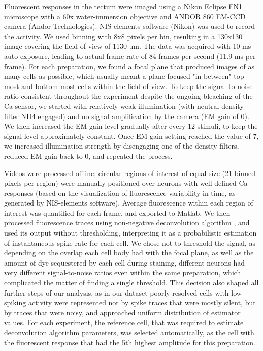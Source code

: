 \documentclass{article}
\begin{document}
Fluorescent responses in the tectum were imaged using a Nikon Eclipse FN1 microscope with a 60x water-immersion objective and ANDOR 860 EM-CCD camera (Andor Technologies). NIS-elements software (Nikon) was used to record the activity. We used binning with 8x8 pixels per bin, resulting in a 130x130 image covering the field of view of 1130 um. The data was acquired with 10 ms auto-exposure, leading to actual frame rate of 84 frames per second (11.9 ms per frame). For each preparation, we found a focal plane that produced images of as many cells as possible, which usually meant a plane focused "in-between" top-most and bottom-most cells within the field of view. To keep the signal-to-noise ratio consistent throughout the experiment despite the ongoing bleaching of the Ca sensor, we started with relatively weak illumination (with neutral density filter ND4 engaged) and no signal amplification by the camera (EM gain of 0). We then increased the EM gain level gradually after every 12 stimuli, to keep the signal level approximately constant. Once EM gain setting reached the value of 7, we increased illumination strength by disengaging one of the density filters, reduced EM gain back to 0, and repeated the process.

Videos were processed offline; circular regions of interest of equal size (21 binned pixels per region) were manually positioned over neurons with well defined Ca responses (based on the visualization of fluorescence variability in time, as generated by NIS-elements software). Average fluorescence within each region of interest was quantified for each frame, and exported to Matlab. We then processed fluorescence traces using non-negative deconvolution algorithm \citep{vogelstein2010oopsi}, and used its output without thresholding, interpreting it as a probabilistic estimation of instantaneous spike rate for each cell. We chose not to threshold the signal, as depending on the overlap each cell body had with the focal plane, as well as the amount of dye sequestered by each cell during staining, different neurons had very different signal-to-noise ratios even within the same preparation, which complicated the matter of finding a single threshold. This decision also shaped all further steps of our analysis, as in our dataset poorly resolved cells with low spiking activity were represented not by spike traces that were mostly silent, but by traces that were noisy, and approached uniform distribution of estimator values. For each experiment, the reference cell, that was required to estimate deconvolution algorithm parameters, was selected automatically, as the cell with the fluorescent response that had the 5th highest amplitude for this preparation.
\end{document}
